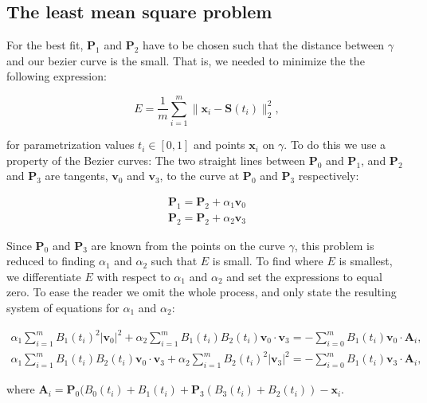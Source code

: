 \documentclass[10pt]{article}
\begin{document}
\subsection*{The least mean square problem}

For the best fit, $\mathbf{P}_1$ and $\mathbf{P}_2$ have to be chosen such that the distance between $\gamma$ and our bezier curve is the small. That is, we needed to minimize the the following expression:

\begin{equation}
E = \frac{1}{m} \sum_{i=1}^{m} \| \mathbf{x}_i - \mathbf{S}(t_i)\|^2_2,
\end{equation}

for parametrization values $t_i \in [ 0,1 ]$ and points $\mathbf{x}_i$ on $\gamma$. To do this we use a property of the Bezier curves: The two straight lines between $\mathbf{P}_0$ and $\mathbf{P}_1$, and $\mathbf{P}_2$ and $\mathbf{P}_3$ are tangents, $\mathbf{v}_0$ and $\mathbf{v}_3$, to the curve at $\mathbf{P}_0$ and $\mathbf{P}_3$ respectively:

\begin{align}
\mathbf{P}_1 = \mathbf{P}_2 + \alpha_1 \mathbf{v}_0 \\
\mathbf{P}_2 = \mathbf{P}_2 + \alpha_2 \mathbf{v}_3
\end{align}

Since $\mathbf{P}_0$ and $\mathbf{P}_3$ are known from the points on the curve $\gamma$, this problem is reduced to finding $\alpha_1$ and $\alpha_2$ such that $E$ is small. To find where $E$ is smallest, we differentiate $E$ with respect to $\alpha_1$ and $\alpha_2$ and set the expressions to equal zero. To ease the reader we omit the whole process, and only state the resulting system of equations for $\alpha_1$ and $\alpha_2$:


\begin{align}
\alpha_1 \sum_{i = 1}^m B_1(t_i)^2 |\mathbf{v}_0|^2 + \alpha_2 \sum_{i = 1}^m B_1(t_i)B_2(t_i)\mathbf{v}_0 \cdot \mathbf{v}_3 
= - \sum_{i = 0}^m B_1(t_i) \mathbf{v}_0 \cdot \mathbf{A}_i, \\
\alpha_1 \sum_{i = 1}^m B_1(t_i)B_2(t_i)\mathbf{v}_0 \cdot \mathbf{v}_3 + \alpha_2 \sum_{i = 1}^m B_2(t_i)^2 |\mathbf{v}_3|^2 
= - \sum_{i = 0}^m B_1(t_i)\mathbf{v}_3 \cdot \mathbf{A}_i,
\end{align}

where $\mathbf{A}_i = \mathbf{P}_0(B_0(t_i) + B_1(t_i) + \mathbf{P}_3(B_3(t_i) + B_2(t_i)) - \mathbf{x}_i$.
\end{document}
